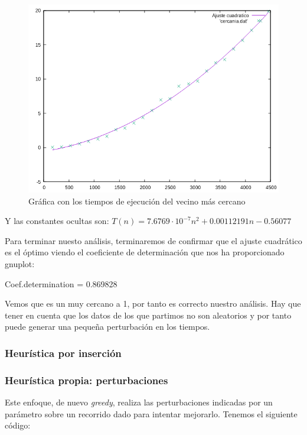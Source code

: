 \documentclass[10pt,a4paper]{article}
\begin{document}
 \begin{figure}[h!]
 	\centering
 	\includegraphics[scale=0.55]{./Images/cercania.png}
 	\caption{Gráfica con los tiempos de ejecución del vecino más cercano}
 \end{figure}
 
 \newpage
 
 Y las constantes ocultas son:
 \(T(n) = 7.6769 \cdot 10^{-7} n^2 + 0.00112191 n - 0.56077\)
 
 Para terminar nuesto análisis, terminaremos de confirmar que el ajuste cuadrático es el óptimo viendo el coeficiente de determinación que nos ha proporcionado gnuplot:
 
 Coef.determination = 0.869828
 
 Vemos que es un muy cercano a 1, por tanto es correcto nuestro análisis. Hay que tener en cuenta que los datos de los que partimos no son aleatorios y por tanto puede generar una pequeña perturbación en los tiempos.

\subsubsection{Heurística por inserción}

\subsubsection{Heurística propia: perturbaciones}

Este enfoque, de nuevo \textit{greedy}, realiza las perturbaciones indicadas por un parámetro sobre un recorrido dado para intentar mejorarlo. Tenemos el siguiente código:

\end{document}
